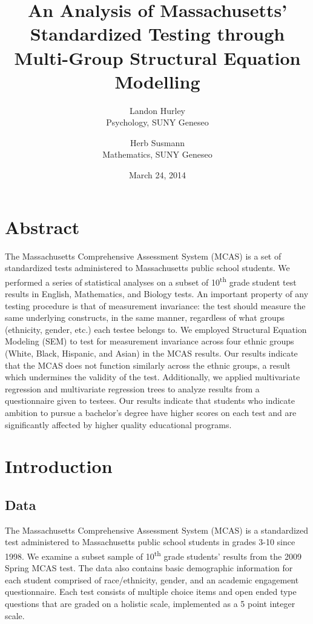 \documentclass{article}\usepackage[]{graphicx}\usepackage[]{color}
\begin{document}
\title{An Analysis of Massachusetts' Standardized Testing through Multi-Group Structural Equation Modelling}
\date{March 24, 2014}
\author{Landon Hurley\\ Psychology, SUNY Geneseo \and Herb Susmann\\ Mathematics, SUNY Geneseo}

\maketitle

\section{Abstract}

The Massachusetts Comprehensive Assessment System (MCAS) is a set of standardized tests administered to Massachusetts public school students. We performed a series of statistical analyses on a subset of 10\textsuperscript{th} grade student test results in English, Mathematics, and Biology tests. An important property of any testing procedure is that of measurement invariance: the test should measure the same underlying constructs, in the same manner, regardless of what groups (ethnicity, gender, etc.) each testee belongs to. We employed Structural Equation Modeling (SEM) to test for measurement invariance across four ethnic groups (White, Black, Hispanic, and Asian) in the MCAS results. Our results indicate that the MCAS does not function similarly across the ethnic groups, a result which undermines the validity of the test. Additionally, we applied multivariate regression and multivariate regression trees to analyze results from a questionnaire given to testees. Our results indicate that students who indicate ambition to pursue a bachelor's degree have higher scores on each test and are significantly affected by higher quality educational programs.

\section{Introduction}

\subsection{Data}

The Massachusetts Comprehensive Assessment System (MCAS) is a standardized test administered to Massachusetts public school students in grades 3-10 since 1998. We examine a subset sample of 10\textsuperscript{th} grade students' results from the 2009 Spring MCAS test. The data also contains basic demographic information for each student comprised of race/ethnicity, gender, and an academic engagement questionnaire. Each test consists of multiple choice items and open ended type questions that are graded on a holistic scale, implemented as a 5 point integer scale. 
\end{document}

